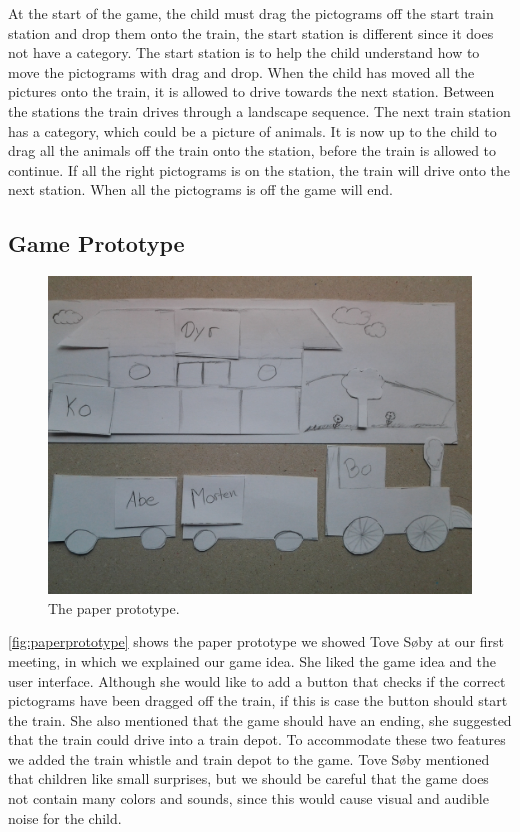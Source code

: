 At the start of the game, the child must drag the pictograms off the start train station and drop them onto the train, the start station is different since it does not have a category. The start station is to help the child understand how to move the pictograms with drag and drop. When the child has moved all the pictures onto the train, it is allowed to drive towards the next station. Between the stations the train drives through a landscape sequence. The next train station has a category, which could be a picture of animals. It is now up to the child to drag all the animals off the train onto the station, before the train is allowed to continue. If all the right pictograms is on the station, the train will drive onto the next station. When all the pictograms is off the game will end.

\subsection{Game Prototype}
\begin{figure}[H]
\centering
\includegraphics[width=0.9\linewidth]{img/screenshots/prototype1.jpg}
\caption{The paper prototype.}
\label{fig:paperprototype}
\end{figure}
\autoref{fig:paperprototype} shows the paper prototype we showed Tove Søby at our first meeting, in which we explained our game idea. She liked the game idea and the user interface. Although she would like to add a button that checks if the correct pictograms have been dragged off the train, if this is case the button should start the train. She also mentioned that the game should have an ending, she suggested that the train could drive into a train depot. To accommodate these two features we added the train whistle and train depot to the game. Tove Søby mentioned that children like small surprises, but we should be careful that the game does not contain many colors and sounds, since this would cause visual and audible noise for the child. 

